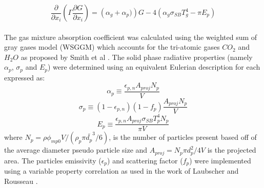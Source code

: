 \documentclass{webofc}
\begin{document}
\begin{equation}
\frac{\partial}{\partial x_{i}}\left(\Gamma\frac{\partial G}{\partial x_{i}}\right)=\left(\alpha_g+\alpha_p)\right)G-4\left(\alpha_g \sigma_{SB} T_{g}^4-\pi E_p \right)
\end{equation}
\\
The gas mixture absorption coefficient was calculated using the weighted sum of gray gases model (WSGGM) which accounts for the tri-atomic gases $CO_2$ and $H_2O$ as proposed by Smith et al \cite{smith}. The solid phase radiative properties (namely $\alpha_p$, $\sigma_p$ and $E_p$) were determined using an equivalent Eulerian description for each expressed as:\\
\begin{equation}
\alpha_p \equiv \frac{\epsilon_{p,n}A_{proj}N_p}{V}
\end{equation}
\begin{equation}
\sigma_p \equiv (1-\epsilon_{p,n})(1-f_p)\frac{A_{proj} N_p}{V}
\end{equation} 
\begin{equation}
E_p \equiv \frac{\epsilon_{p,n}A_{proj}\sigma_{SB} T_{p}^4 N_p}{\pi V}
\end{equation}
where $N_p = \rho \phi_{mp0} V / \left( \rho_p \pi \bar{d_p}^3 /6 \right)$, is the number of particles present based off of the average diameter pseudo particle size and $A_{proj} = N_p \pi d_p^2 / 4 V$ is the projected area. The particles emissivity ($\epsilon_p$) and scattering factor ($f_p$) were implemented using a variable property correlation as used in the work of Laubscher and Rousseau \cite{laubscher_3}.
\end{document}
